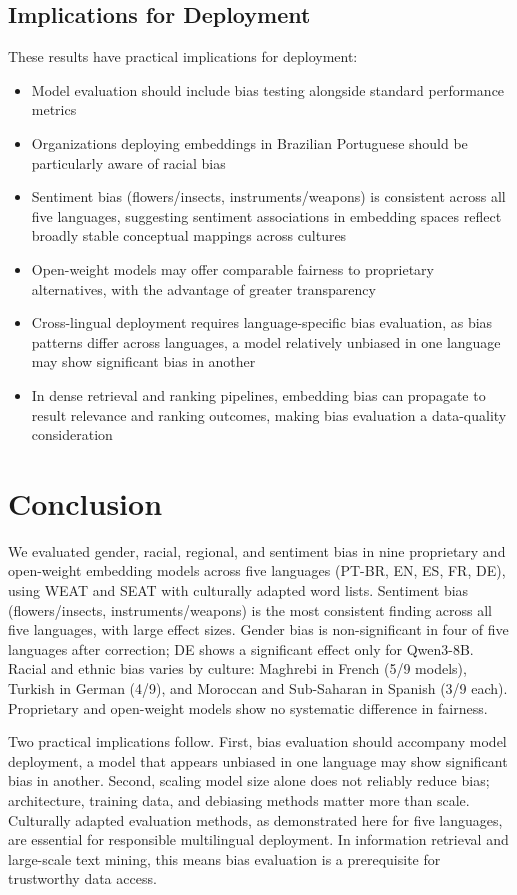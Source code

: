 \documentclass{sbc2019}
\begin{document}
\subsection{Implications for Deployment}

These results have practical implications for deployment:
\begin{itemize}[nosep]
    \item Model evaluation should include bias testing alongside standard performance metrics
    \item Organizations deploying embeddings in Brazilian Portuguese should be particularly aware of racial bias
    \item Sentiment bias (flowers/insects, instruments/weapons) is consistent across all five languages, suggesting sentiment associations in embedding spaces reflect broadly stable conceptual mappings across cultures
    \item Open-weight models may offer comparable fairness to proprietary alternatives, with the advantage of greater transparency
    \item Cross-lingual deployment requires language-specific bias evaluation, as bias patterns differ across languages, a model relatively unbiased in one language may show significant bias in another
    \item In dense retrieval and ranking pipelines, embedding bias can propagate to result relevance and ranking outcomes, making bias evaluation a data-quality consideration
\end{itemize}

\section{Conclusion}

We evaluated gender, racial, regional, and sentiment bias in nine proprietary and open-weight embedding models across five languages (PT-BR, EN, ES, FR, DE), using WEAT and SEAT with culturally adapted word lists. Sentiment bias (flowers/insects, instruments/weapons) is the most consistent finding across all five languages, with large effect sizes. Gender bias is non-significant in four of five languages after correction; DE shows a significant effect only for Qwen3-8B. Racial and ethnic bias varies by culture: Maghrebi in French (5/9 models), Turkish in German (4/9), and Moroccan and Sub-Saharan in Spanish (3/9 each). Proprietary and open-weight models show no systematic difference in fairness.

Two practical implications follow. First, bias evaluation should accompany model deployment, a model that appears unbiased in one language may show significant bias in another. Second, scaling model size alone does not reliably reduce bias; architecture, training data, and debiasing methods matter more than scale. Culturally adapted evaluation methods, as demonstrated here for five languages, are essential for responsible multilingual deployment. In information retrieval and large-scale text mining, this means bias evaluation is a prerequisite for trustworthy data access.
\end{document}
